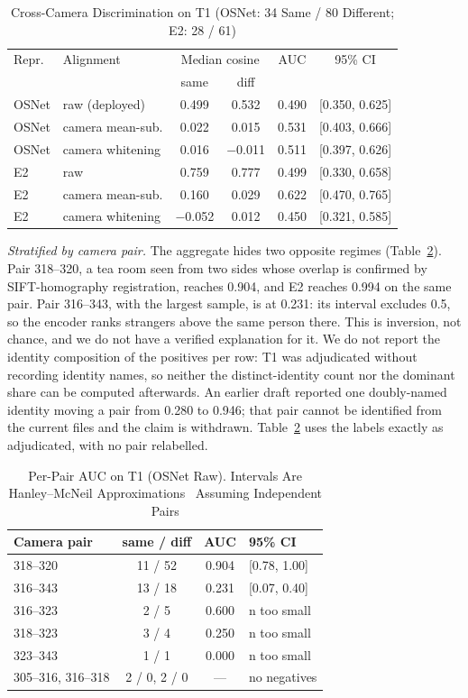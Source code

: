 \documentclass[journal]{IEEEtran}
\begin{document}
\begin{table}[t]
\caption{Cross-Camera Discrimination on T1 (OSNet: 34 Same / 80 Different; E2: 28 / 61)}\label{tab:agg}
\centering
\setlength{\tabcolsep}{4pt}
\begin{tabular}{@{}llcccc@{}}
\toprule
Repr. & Alignment & \multicolumn{2}{c}{Median cosine} & AUC & 95\% CI\\
 & & same & diff & & \\
\midrule
OSNet & raw (deployed) & 0.499 & 0.532 & 0.490 & [0.350, 0.625]\\
OSNet & camera mean-sub. & 0.022 & 0.015 & 0.531 & [0.403, 0.666]\\
OSNet & camera whitening & 0.016 & $-$0.011 & 0.511 & [0.397, 0.626]\\
E2 & raw & 0.759 & 0.777 & 0.499 & [0.330, 0.658]\\
E2 & camera mean-sub. & 0.160 & 0.029 & 0.622 & [0.470, 0.765]\\
E2 & camera whitening & $-$0.052 & 0.012 & 0.450 & [0.321, 0.585]\\
\bottomrule
\end{tabular}
\end{table}

\emph{Stratified by camera pair.} The aggregate hides two opposite regimes (Table~\ref{tab:pair}). Pair 318--320, a tea room seen from two sides whose overlap is confirmed by SIFT-homography registration, reaches 0.904, and E2 reaches 0.994 on the same pair. Pair 316--343, with the largest sample, is at 0.231: its interval excludes 0.5, so the encoder ranks strangers above the same person there. This is inversion, not chance, and we do not have a verified explanation for it. We do not report the identity composition of the positives per row: T1 was adjudicated without recording identity names, so neither the distinct-identity count nor the dominant share can be computed afterwards. An earlier draft reported one doubly-named identity moving a pair from 0.280 to 0.946; that pair cannot be identified from the current files and the claim is withdrawn. Table~\ref{tab:pair} uses the labels exactly as adjudicated, with no pair relabelled.

\begin{table}[t]
\caption{Per-Pair AUC on T1 (OSNet Raw). Intervals Are Hanley--McNeil Approximations~\cite{hanley1982} Assuming Independent Pairs}\label{tab:pair}
\centering
\setlength{\tabcolsep}{4pt}
\begin{tabular}{@{}lccl@{}}
\toprule
Camera pair & same / diff & AUC & 95\% CI\\
\midrule
318--320 & 11 / 52 & 0.904 & [0.78, 1.00]\\
316--343 & 13 / 18 & 0.231 & [0.07, 0.40]\\
316--323 & 2 / 5 & 0.600 & n too small\\
318--323 & 3 / 4 & 0.250 & n too small\\
323--343 & 1 / 1 & 0.000 & n too small\\
305--316, 316--318 & 2 / 0, 2 / 0 & --- & no negatives\\
\bottomrule
\end{tabular}
\end{table}
\end{document}
